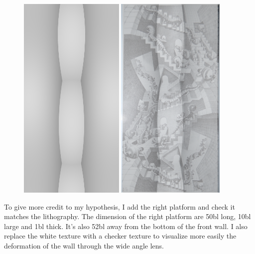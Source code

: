 \documentclass[12pt, a4paper]{article}
\begin{document}
\begin{center}
\begin{figure}[H]
\centering
\includegraphics[height=10cm]{./XL-51_2.png}
\includegraphics[height=10cm]{./checkDimensionViewPoint_2.png}\\
\end{figure}
\end{center}

To give more credit to my hypothesis, I add the right platform and check it matches the lithography. The dimension of the right platform are 50bl long, 10bl large and 1bl thick. It's also 52bl away from the bottom of the front wall. I also replace the white texture with a checker texture to visualize more easily the deformation of the wall through the wide angle lens.\\
\end{document}
